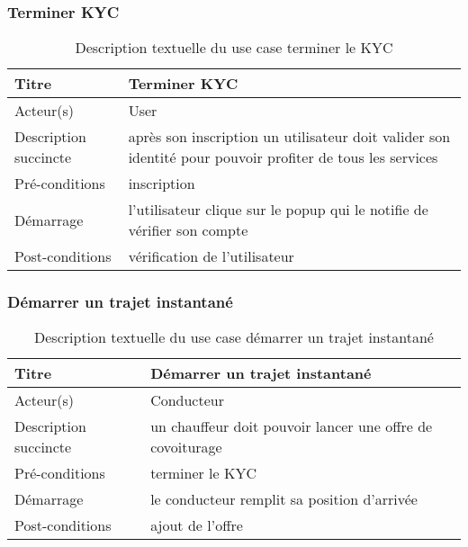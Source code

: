 \subsubsection{Terminer KYC} %
\begin{table}[H]
\begin{center}
    \begin{tabular}{ | l | p{10cm} |}
    \hline
    Titre & Terminer KYC \\ \hline
    Acteur(s) & User \\ \hline
    Description succincte & après son inscription un utilisateur doit valider son identité pour pouvoir profiter de tous les services \\ \hline
    Pré-conditions & inscription \\ \hline
    Démarrage & l'utilisateur clique sur le popup qui le notifie de vérifier son compte \\ \hline
    Post-conditions & vérification de l'utilisateur \\ \hline
    \end{tabular}
    \caption{Description textuelle du use case terminer le KYC}
\end{center}
\end{table}

\subsubsection{Démarrer un trajet instantané} %
\begin{table}[H]
\begin{center}
    \begin{tabular}{ | l | p{10cm} |}
    \hline
    Titre & Démarrer un trajet instantané \\ \hline
    Acteur(s) & Conducteur \\ \hline
    Description succincte & un chauffeur doit pouvoir lancer une offre de covoiturage \\ \hline
    Pré-conditions & terminer le KYC \\ \hline
    Démarrage & le conducteur remplit sa position d'arrivée \\ \hline
    Post-conditions & ajout de l'offre \\ \hline
    \end{tabular}
    \caption{Description textuelle du use case démarrer un trajet instantané}
\end{center}
\end{table}

